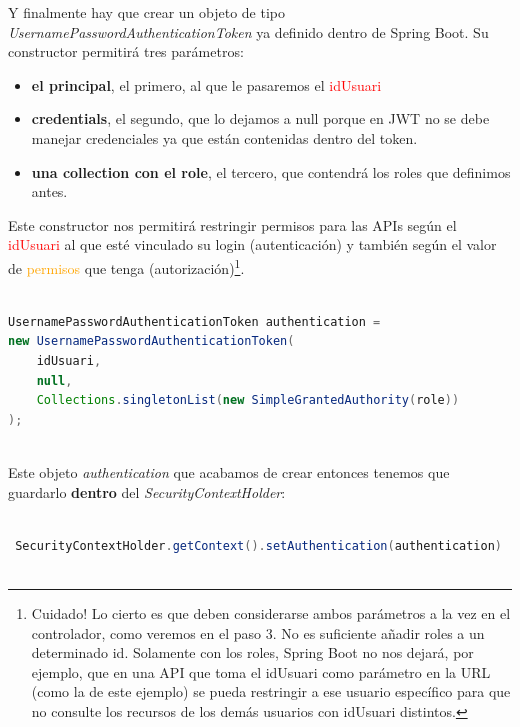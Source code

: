\documentclass[a4paper,12pt]{report}
\begin{document}
		  
		  Y finalmente hay que crear un objeto de tipo \textit{UsernamePasswordAuthenticationToken} ya definido dentro de Spring Boot. Su constructor permitirá tres parámetros: 
		 
		 	\begin{itemize}
		 	\setlength{\itemsep}{-.5em}

			  \item \textbf{el principal}, el primero, al que le pasaremos el \textcolor{red}{idUsuari}
			 \item  \textbf{credentials}, el segundo, que lo dejamos a null porque en JWT no se debe manejar credenciales ya que están contenidas dentro del token. 
			  \item \textbf{una collection con el role}, el tercero, que contendrá los roles que definimos antes. 
		  \end{itemize}
		  Este constructor nos permitirá restringir permisos para las APIs según el \textcolor{red}{idUsuari} al que esté vinculado su login (autenticación) y también según el valor de \textcolor{orange}{permisos} que tenga (autorización)\footnote{Cuidado! Lo cierto es que deben considerarse ambos parámetros a la vez en el controlador, como veremos en el paso 3. No es suficiente añadir roles a un determinado id. Solamente con los roles, Spring Boot no nos dejará, por ejemplo, que en una API que toma el idUsuari como parámetro en la URL (como la de este ejemplo) se pueda restringir a ese usuario específico para que no consulte los recursos de los demás usuarios con idUsuari distintos.}.
		  

		  
		  
 \begin{lstlisting}[language=Java, basicstyle=\ttfamily\footnotesize, keywordstyle=\color{magenta}]
	  	
UsernamePasswordAuthenticationToken authentication = 
new UsernamePasswordAuthenticationToken(
	idUsuari,
	null,
	Collections.singletonList(new SimpleGrantedAuthority(role))
);



 \end{lstlisting}
Este objeto \textit{authentication} que acabamos de crear entonces tenemos que guardarlo \textbf{dentro} del \textit{SecurityContextHolder}:

		 
 \begin{lstlisting}[language=Java, basicstyle=\ttfamily\footnotesize, keywordstyle=\color{magenta}]

 SecurityContextHolder.getContext().setAuthentication(authentication)
	
\end{lstlisting}
	
\end{document}

